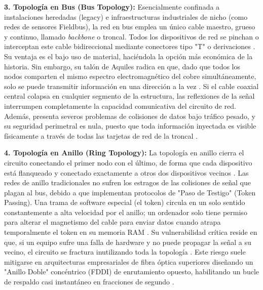 \documentclass[a4paper,12pt]{article}
\begin{document}
\textbf{3. Topología en Bus (Bus Topology):}
Esencialmente confinada a instalaciones heredadas (legacy) e infraestructuras industriales de nicho (como redes de sensores Fieldbus), la red en bus emplea un único cable maestro, grueso y continuo, llamado \textit{backbone} o troncal. Todos los dispositivos de red se pinchan o interceptan este cable bidireccional mediante conectores tipo "T" o derivaciones \cite{topology_geeks, topology_wiki}. Su ventaja es el bajo uso de material, haciéndola la opción más económica de la historia. Sin embargo, su talón de Aquiles radica en que, dado que todos los nodos comparten el mismo espectro electromagnético del cobre simultáneamente, solo se puede transmitir información en una dirección a la vez \cite{topology_international}. Si el cable coaxial central colapsa en cualquier segmento de la estructura, las reflexiones de la señal interrumpen completamente la capacidad comunicativa del circuito de red. Además, presenta severos problemas de colisiones de datos bajo tráfico pesado, y su seguridad perimetral es nula, puesto que toda información inyectada es visible físicamente a través de todas las tarjetas de red de la troncal \cite{topology_geeks}.

\textbf{4. Topología en Anillo (Ring Topology):}
La topología en anillo cierra el circuito conectando el primer nodo con el último, de forma que cada dispositivo está flanqueado y conectado exactamente a otros dos dispositivos vecinos \cite{topology_geeks}. Las redes de anillo tradicionales no sufren los estragos de las colisiones de señal que plagan al bus, debido a que implementan protocolos de "Paso de Testigo" (Token Passing). Una trama de software especial (el token) circula en un solo sentido constantemente a alta velocidad por el anillo; un ordenador solo tiene permiso para alterar el magnetismo del cable para enviar datos cuando atrapa temporalmente el token en su memoria RAM \cite{topology_geeks}. Su vulnerabilidad crítica reside en que, si un equipo sufre una falla de hardware y no puede propagar la señal a su vecino, el circuito se fractura inutilizando toda la topología \cite{topology_international}. Este riesgo suele mitigarse en arquitecturas empresariales de fibra óptica superiores diseñando un "Anillo Doble" concéntrico (FDDI) de enrutamiento opuesto, habilitando un bucle de respaldo casi instantáneo en fracciones de segundo \cite{topology_geeks}.
\end{document}

